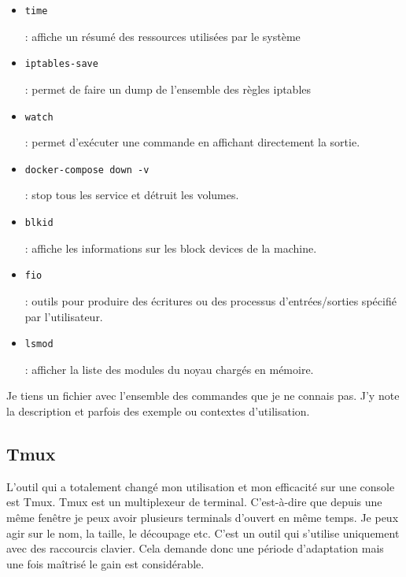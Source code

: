 \documentclass[12pt]{article}
\begin{document}
\begin{itemize}
    \item \begin{code}\texttt{time}\end{code}: affiche un résumé des ressources utilisées par le système
    \item \begin{code}\texttt{iptables-save}\end{code}: permet de faire un dump de l'ensemble des règles iptables
    \item \begin{code}\texttt{watch}\end{code}: permet d'exécuter une commande en affichant directement la sortie.
    \item \begin{code}\texttt{docker-compose down -v}\end{code}: stop tous les service et détruit les volumes.
    \item \begin{code}\texttt{blkid}\end{code}: affiche les informations sur les block devices de la machine.
    \item \begin{code}\texttt{fio}\end{code}: outils pour produire des écritures ou des processus d'entrées/sorties spécifié par l'utilisateur.
    \item \begin{code}\texttt{lsmod}\end{code}: afficher la liste des modules du noyau chargés en mémoire. 

\end{itemize}

Je tiens un fichier avec l'ensemble des commandes que je ne connais pas.
J'y note la description et parfois des exemple ou contextes d'utilisation.


\subsection{Tmux}
L'outil qui a totalement changé mon utilisation et mon efficacité sur une console est Tmux.
Tmux est un multiplexeur de terminal.
C'est-à-dire que depuis une même fenêtre je peux avoir plusieurs terminals d'ouvert en même temps.
Je peux agir sur le nom, la taille, le découpage etc.
C'est un outil qui s'utilise uniquement avec des raccourcis clavier.
Cela demande donc une période d'adaptation mais une fois maîtrisé le gain est considérable.
\end{document}
